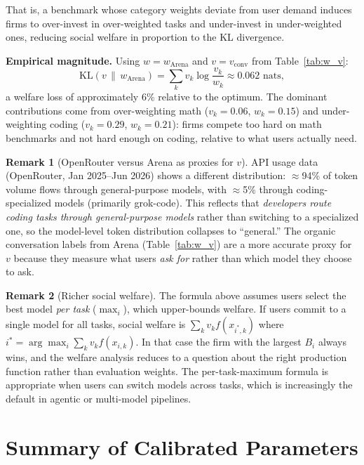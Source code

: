 \documentclass{article}
\theoremstyle{definition}
\newtheorem{remark}{Remark}
\begin{document}
\noindent That is, a benchmark whose category weights deviate from user demand
induces firms to over-invest in over-weighted tasks and under-invest in
under-weighted ones, reducing social welfare in proportion to the KL divergence.

\medskip
\noindent\textbf{Empirical magnitude.}
Using $w = w_\text{Arena}$ and $v = v_\text{conv}$ from Table~\ref{tab:w_v}:
\[
  \mathrm{KL}(v \,\|\, w_\text{Arena})
  = \sum_k v_k \log\frac{v_k}{w_k}
  \approx 0.062 \text{ nats},
\]
a welfare loss of approximately 6\% relative to the optimum.
The dominant contributions come from over-weighting math ($v_k = 0.06$,
$w_k = 0.15$) and under-weighting coding ($v_k = 0.29$, $w_k = 0.21$):
firms compete too hard on math benchmarks and not hard enough on coding,
relative to what users actually need.

\begin{remark}[OpenRouter versus Arena as proxies for $v$]
API usage data (OpenRouter, Jan 2025--Jun 2026) shows a different distribution:
$\approx$94\% of token volume flows through general-purpose models, with
$\approx$5\% through coding-specialized models (primarily grok-code).
This reflects that \emph{developers route coding tasks through general-purpose
models} rather than switching to a specialized one, so the model-level token
distribution collapses to ``general.''  The organic conversation labels
from Arena (Table~\ref{tab:w_v}) are a more accurate proxy for $v$ because
they measure what users \emph{ask for} rather than which model they choose to
ask.
\end{remark}

\begin{remark}[Richer social welfare]
The formula above assumes users select the best model \emph{per task} ($\max_i$),
which upper-bounds welfare.  If users commit to a single model for all tasks,
social welfare is $\sum_k v_k f(x_{i^*, k})$ where
$i^* = \arg\max_i \sum_k v_k f(x_{i,k})$.  In that case the firm with the
largest $B_i$ always wins, and the welfare analysis reduces to a question
about the right production function rather than evaluation weights.
The per-task-maximum formula is appropriate when users can switch models across
tasks, which is increasingly the default in agentic or multi-model pipelines.
\end{remark}


\section{Summary of Calibrated Parameters}
\end{document}
